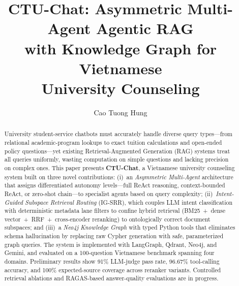 \documentclass[runningheads]{llncs}
\begin{document}
\title{CTU-Chat: Asymmetric Multi-Agent Agentic RAG\\with Knowledge Graph for Vietnamese\\University Counseling}

\author{Cao Tuong Hung}



\maketitle

\begin{abstract}
University student-service chatbots must accurately handle diverse query types---from relational academic-program lookups to exact tuition calculations and open-ended policy questions---yet existing Retrieval-Augmented Generation (RAG) systems treat all queries uniformly, wasting computation on simple questions and lacking precision on complex ones.
This paper presents \textbf{CTU-Chat}, a Vietnamese university counseling system built on three novel contributions:
(i)~an \emph{Asymmetric Multi-Agent} architecture that assigns differentiated autonomy levels---full ReAct reasoning, context-bounded ReAct, or zero-shot chain---to specialist agents based on query complexity;
(ii)~\emph{Intent-Guided Subspace Retrieval Routing} (IG-SRR), which couples LLM intent classification with deterministic metadata lane filters to confine hybrid retrieval (BM25~+~dense vector~+~RRF~+~cross-encoder reranking) to ontologically correct document subspaces; and
(iii)~a \emph{Neo4j Knowledge Graph} with typed Python tools that eliminates schema hallucination by replacing raw Cypher generation with safe, parameterized graph queries.
The system is implemented with LangGraph, Qdrant, Neo4j, and Gemini, and evaluated on a 100-question Vietnamese benchmark spanning four domains.
Preliminary results show 91\% LLM-judge pass rate, 96.67\% tool-calling accuracy, and 100\% expected-source coverage across reranker variants.
Controlled retrieval ablations and RAGAS-based answer-quality evaluations are in progress.

\end{abstract}
\end{document}

